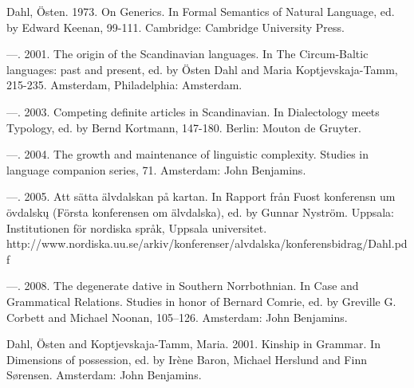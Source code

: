 \begin{styleBodytextC}
Dahl, Östen. 1973. On Generics. In Formal Semantics of Natural Language, ed. by Edward Keenan, 99-111. Cambridge: Cambridge University Press.

\end{styleBodytextC}

\begin{styleBodytextC}
—. 2001. The origin of the Scandinavian languages. In The Circum-Baltic languages: past and present, ed. by Östen Dahl and Maria Koptjevskaja-Tamm, 215-235. Amsterdam, Philadelphia: Amsterdam.

\end{styleBodytextC}

\begin{styleBodytextC}
—. 2003. Competing definite articles in Scandinavian. In Dialectology meets Typology, ed. by Bernd Kortmann, 147-180. Berlin: Mouton de Gruyter.

\end{styleBodytextC}

\begin{styleBodytextC}
—. 2004. The growth and maintenance of linguistic complexity. Studies in language companion series, 71. Amsterdam: John Benjamins.

\end{styleBodytextC}

\begin{styleBodytextC}
—. 2005. Att sätta älvdalskan på kartan. In Rapport från Fuost konferensn um övdalsk\k{u} (Första konferensen om älvdalska), ed. by Gunnar Nyström. Uppsala: Institutionen för nordiska språk, Uppsala universitet. http://www.nordiska.uu.se/arkiv/konferenser/alvdalska/konferensbidrag/Dahl.pdf 

\end{styleBodytextC}

\begin{styleBodytextC}
—. 2008. The degenerate dative in Southern Norrbothnian. In Case and Grammatical Relations. Studies in honor of Bernard Comrie, ed. by Greville G. Corbett and Michael Noonan, 105–126. Amsterdam: John Benjamins.

\end{styleBodytextC}

\begin{styleBodytextC}
Dahl, Östen and Koptjevskaja-Tamm, Maria. 2001. Kinship in Grammar. In Dimensions of possession, ed. by Irène Baron, Michael Herslund and Finn Sørensen. Amsterdam: John Benjamins.

\end{styleBodytextC}

